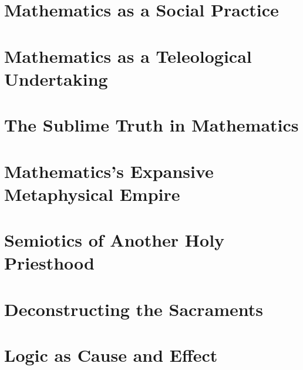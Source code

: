 \documentclass[ms,a4paper]{memoir}
\begin{document}
	\section{Mathematics as a Social Practice}
	\section{Mathematics as a Teleological Undertaking}
	\section{The Sublime Truth in Mathematics}
	\section{Mathematics's Expansive Metaphysical Empire}
	\section{Semiotics of Another Holy Priesthood}
	\section{Deconstructing the Sacraments}
	\section{Logic as Cause and Effect}
\end{document}
